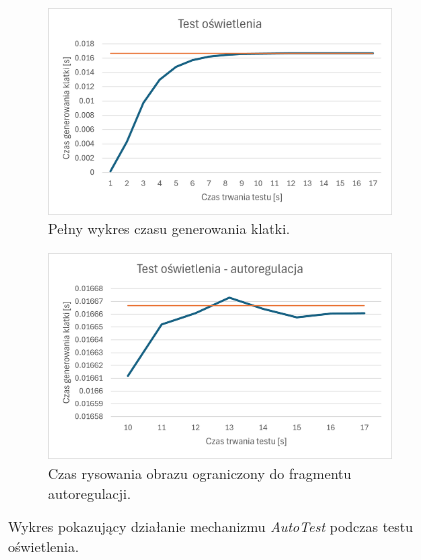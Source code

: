 	\begin{figure}[h!]
		\begin{subfigure}{.5\textwidth}
			\centering
			\includegraphics[width=\textwidth]{images/LightsTestResult_full.png}
			\caption{Pełny wykres czasu generowania klatki.}
			\label{Test_LightsTest_FullFrameTime}
		\end{subfigure}
		\begin{subfigure}{.5\textwidth}
			\centering
			\includegraphics[width=\textwidth]{images/LightsTestResult_auto.png}
			\caption{Czas rysowania obrazu ograniczony do fragmentu autoregulacji.}
			\label{Test_LightsTest_AutoFrameTime}
		\end{subfigure}
		\caption{Wykres pokazujący działanie mechanizmu \textit{AutoTest} podczas testu oświetlenia.}
	\end{figure}
	
